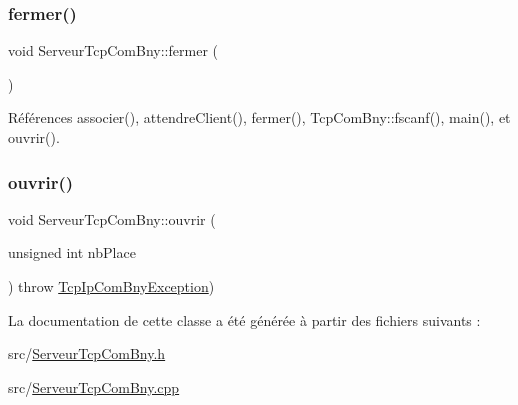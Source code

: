 \mbox{\label{classServeurTcpComBny_af73cb54b2510fdd3c0f691088dfc37aa}} 
\subsubsection{\texorpdfstring{fermer()}{fermer()}}
{\footnotesize\ttfamily void Serveur\+Tcp\+Com\+Bny\+::fermer (\begin{DoxyParamCaption}{ }\end{DoxyParamCaption})}



Références associer(), attendre\+Client(), fermer(), Tcp\+Com\+Bny\+::fscanf(), main(), et ouvrir().

\mbox{\label{classServeurTcpComBny_a56d281ce53adc63348180b19c9eac759}} 
\subsubsection{\texorpdfstring{ouvrir()}{ouvrir()}}
{\footnotesize\ttfamily void Serveur\+Tcp\+Com\+Bny\+::ouvrir (\begin{DoxyParamCaption}\item[{unsigned int}]{nb\+Place }\end{DoxyParamCaption}) throw  \hyperlink{classTcpIpComBnyException}{Tcp\+Ip\+Com\+Bny\+Exception}) }



La documentation de cette classe a été générée à partir des fichiers suivants \+:\begin{DoxyCompactItemize}
\item 
src/\hyperlink{ServeurTcpComBny_8h}{Serveur\+Tcp\+Com\+Bny.\+h}\item 
src/\hyperlink{ServeurTcpComBny_8cpp}{Serveur\+Tcp\+Com\+Bny.\+cpp}\end{DoxyCompactItemize}
